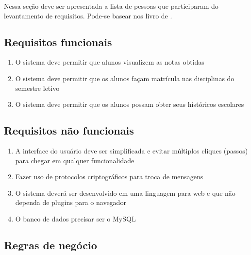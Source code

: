 \documentclass[11pt]{article}
\begin{document}
Nessa seção deve ser apresentada a lista de pessoas que participaram do levantamento de requisitos. Pode-se basear nos livro de \cite{bezerra02}.

\lipsum[2]


\subsection{Requisitos funcionais}
\label{sec:reqfuncionais}

\begin{enumerate}
	\item O sistema deve permitir que alunos visualizem as notas obtidas
	\item O sistema deve permitir que os alunos façam matrícula nas disciplinas do semestre letivo
	\item O sistema deve permitir que os alunos possam obter seus históricos escolares
\end{enumerate}

\subsection{Requisitos não funcionais}
\label{sec:reqnaofuncionais}

\begin{enumerate}
	\item A interface do usuário deve ser simplificada e evitar múltiplos cliques (passos) para chegar em qualquer funcionalidade
	\item Fazer uso de protocolos criptográficos para troca de mensagens
	\item O sistema deverá ser desenvolvido em uma linguagem para web e que não dependa de plugins para o navegador
	\item O banco de dados precisar ser o MySQL
\end{enumerate}

\subsection{Regras de negócio}
\label{sec:regrasdenegocio}
\end{document}
